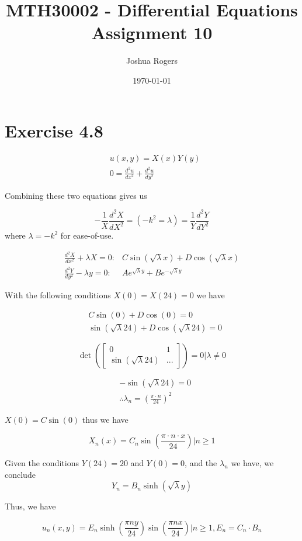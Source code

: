 \documentclass{article}
\title{\vspace{-4cm}MTH30002 - Differential Equations Assignment 10}
\author{Joshua Rogers}
\date\today
\begin{document}
\maketitle
\section*{Exercise 4.8}

\begin{align*}
& u(x,y) = X(x)Y(y) \\
& 0 = \frac{d^2u}{dx^2} + \frac{d^2u}{dy^2}
\end{align*}

Combining these two equations gives us

$$-\frac{1}{X} \frac{d^2X}{dX^2} = (-k^2 = \lambda) = \frac{1}{Y} \frac{d^2Y}{dY^2}$$
where $\lambda = -k^2$ for ease-of-use.

\begin{align*}
\frac{d^2X}{dx^2} + \lambda X =0: &C\sin(\sqrt\lambda x) + D\cos(\sqrt\lambda x)\\
\frac{d^2Y}{dy^2}-\lambda y=0: &Ae^{\sqrt\lambda y} + Be^{-\sqrt\lambda y}
\end{align*}

With the following conditions
$X(0) = X(24) = 0$ we have

\begin{align*}
&C\sin(0) + D\cos(0) = 0\\
&\sin(\sqrt\lambda 24) + D\cos(\sqrt\lambda 24) =0
\end{align*}

$$\det \left( \begin{bmatrix} 0 & 1 \\ \sin(\sqrt\lambda 24) & ... \end{bmatrix} \right) = 0 \Bigr| \lambda \neq 0 $$

\begin{align*}
&-\sin(\sqrt\lambda 24)=0\\
& \therefore \lambda_n = \left(\frac{\pi \cdot n}{24}\right)^2
\end{align*}

$X(0) = C\sin(0)$ thus we have

$$X_n(x) = C_n\sin\left(\frac{\pi \cdot n \cdot x}{24}\right)\Bigr| n\geq 1$$

Given the conditions $Y(24)=20$ and $Y(0)=0$, and the $\lambda_n$ we have, we conclude
$$Y_n=B_n\sinh\left(\sqrt\lambda y\right)$$

Thus, we have

$$u_n(x,y) = E_n\sinh\left(\frac{\pi n y}{24}\right) \sin\left(\frac{\pi n x}{24}\right)\Bigr| n \geq 1, E_n = C_n \cdot B_n$$
\end{document}

